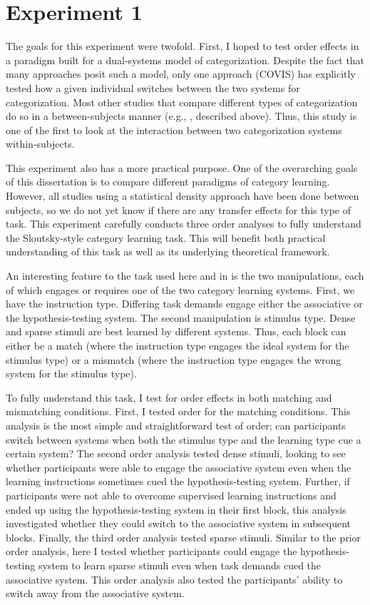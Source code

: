 \documentclass[../dissertation.tex]{subfiles}
\begin{document}
\section{Experiment 1}

The goals for this experiment were twofold. First, I hoped to test order effects in a paradigm built for a dual-systems model of categorization. Despite the fact that many approaches posit such a model, only one approach (COVIS) has explicitly tested how a given individual switches between the two systems for categorization. Most other studies that compare different types of categorization do so in a between-subjects manner (e.g., \citealp{Ashby2010, Erickson2008}, described above). Thus, this study is one of the first to look at the interaction between two categorization systems within-subjects. \par
	This experiment also has a more practical purpose. One of the overarching goals of this dissertation is to compare different paradigms of category learning. However, all studies using a statistical density approach have been done between subjects, so we do not yet know if there are any transfer effects for this type of task. This experiment carefully conducts three order analyses to fully understand the Sloutsky-style category learning task. This will benefit both  practical understanding of this task as well as its underlying theoretical framework. \par
	An interesting feature to the task used here and in \citet{Kloos2008} is the two manipulations, each of which engages or requires one of the two category learning systems. First, we have the instruction type. Differing task demands engage either the associative or the hypothesis-testing system. The second manipulation is stimulus type. Dense and sparse stimuli are best learned by different systems. Thus, each block can either be a match (where the instruction type engages the ideal system for the stimulus type) or a mismatch (where the instruction type engages the wrong system for the stimulus type). \par 
	To fully understand this task, I test for order effects in both matching and mismatching conditions.  First, I tested order for the matching conditions. This analysis is the most simple and straightforward test of order; can participants switch between systems when both the stimulus type and the learning type cue a certain system? The second order analysis tested dense stimuli, looking to see whether participants were able to engage the associative system even when the learning instructions sometimes cued the hypothesis-testing system. Further, if participants were not able to overcome supervised learning instructions and ended up using the hypothesis-testing system in their first block, this analysis investigated whether they could switch to the associative system in subsequent blocks. Finally, the third order analysis tested sparse stimuli. Similar to the prior order analysis, here I tested whether participants could engage the hypothesis-testing system to learn sparse stimuli even when task demands cued the associative system. This order analysis also tested the participants' ability to switch away from the associative system.
	
\end{document}
